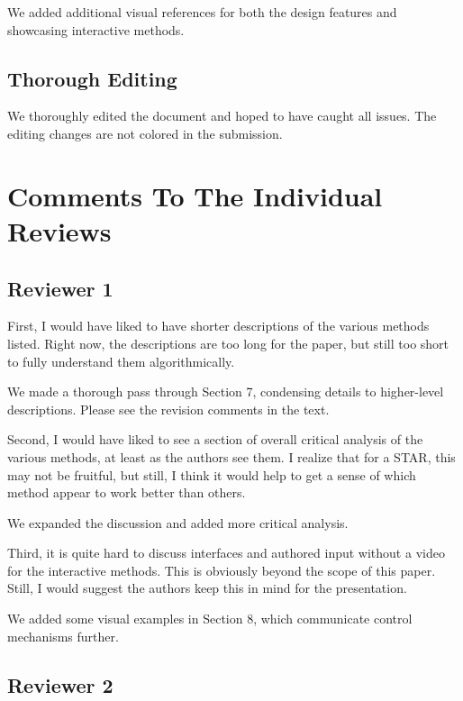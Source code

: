 \documentclass{egpubl}
\newcommand{\rev}[2]{{\color{greenrev}\textsuperscript{#1}#2}}
\renewcommand{\rev}[2]{{#2}}
\begin{document}
\rev{}{We added additional visual references for both the design features and showcasing interactive methods.}

\subsection*{Thorough Editing}

\rev{}{We thoroughly edited the document and hoped to have caught all issues. The editing changes are not colored in the submission.}


\section*{Comments To The Individual Reviews}

\subsection*{Reviewer 1} 

First, I would have liked to have shorter descriptions of the various methods listed. Right now, the descriptions are too long for the paper, but still too short to fully understand them algorithmically.

\rev{Comment}{We made a thorough pass through Section 7, condensing details to higher-level descriptions. Please see the revision comments in the text.}

Second, I would have liked to see a section of overall critical analysis of the various methods, at least as the authors see them. I realize that for a STAR, this may not be fruitful, but still, I think it would help to get a sense of which method appear to work better than others.

\rev{Comment}{We expanded the discussion and added more critical analysis.}

Third, it is quite hard to discuss interfaces and authored input without a video for the interactive methods. This is obviously beyond the scope of this paper. Still, I would suggest the authors keep this in mind for the presentation.

\rev{Comment}{We added some visual examples in Section 8, which communicate control mechanisms further.}



\subsection*{Reviewer 2}
\end{document}
